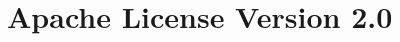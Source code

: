 \documentclass[english, biblatex, digitaloutput]{kththesis}
\begin{document}
\ifbiblatex
	\printbibliography[heading=bibintoc]
\else
	
\fi




\cleardoublepage
\appendix
\renewcommand{\chaptermark}[1]{\markboth{Appendix \thechapter\relax:\thinspace\relax#1}{}}
\chapter{Apache License Version 2.0}
\label{ch:Apache2.0}









\end{document}
